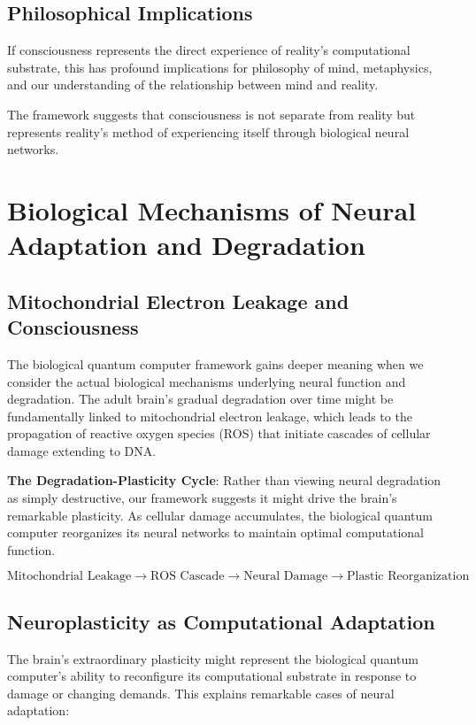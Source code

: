 \documentclass[12pt]{article}
\begin{document}
\subsection{Philosophical Implications}

If consciousness represents the direct experience of reality's computational substrate, this has profound implications for philosophy of mind, metaphysics, and our understanding of the relationship between mind and reality.

The framework suggests that consciousness is not separate from reality but represents reality's method of experiencing itself through biological neural networks.

\section{Biological Mechanisms of Neural Adaptation and Degradation}

\subsection{Mitochondrial Electron Leakage and Consciousness}

The biological quantum computer framework gains deeper meaning when we consider the actual biological mechanisms underlying neural function and degradation. The adult brain's gradual degradation over time might be fundamentally linked to mitochondrial electron leakage, which leads to the propagation of reactive oxygen species (ROS) that initiate cascades of cellular damage extending to DNA.

\textbf{The Degradation-Plasticity Cycle}: Rather than viewing neural degradation as simply destructive, our framework suggests it might drive the brain's remarkable plasticity. As cellular damage accumulates, the biological quantum computer reorganizes its neural networks to maintain optimal computational function.

$$\text{Mitochondrial Leakage} \rightarrow \text{ROS Cascade} \rightarrow \text{Neural Damage} \rightarrow \text{Plastic Reorganization}$$

\subsection{Neuroplasticity as Computational Adaptation}

The brain's extraordinary plasticity might represent the biological quantum computer's ability to reconfigure its computational substrate in response to damage or changing demands. This explains remarkable cases of neural adaptation:
\end{document}
